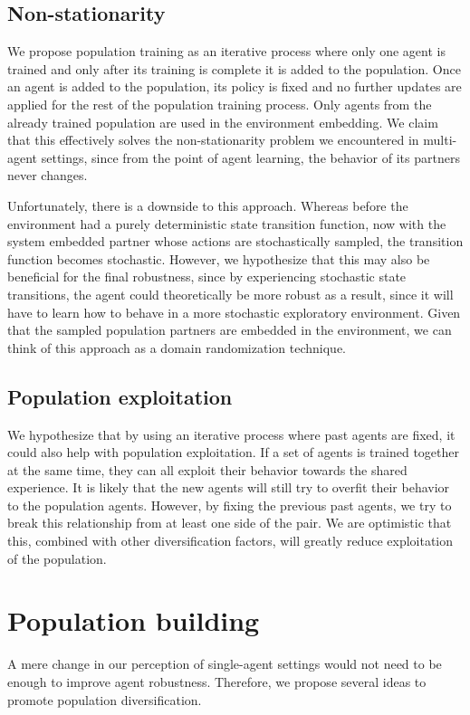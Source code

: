 \subsection{Non-stationarity}
We propose population training as an iterative process where only one agent is trained and only after its training is complete it is added to the population.
Once an agent is added to the population, its policy is fixed and no further updates are applied for the rest of the population training process.
Only agents from the already trained population are used in the environment embedding.
We claim that this effectively solves the non-stationarity problem we encountered in multi-agent settings, since from the point of agent learning, the behavior of its partners never changes.

Unfortunately, there is a downside to this approach.
Whereas before the environment had a purely deterministic state transition function, now with the system embedded partner whose actions are stochastically sampled, the transition function becomes stochastic.
However, we hypothesize that this may also be beneficial for the final robustness, since by experiencing stochastic state transitions, the agent could theoretically be more robust as a result, since it will have to learn how to behave in a more stochastic exploratory environment.
Given that the sampled population partners are embedded in the environment, we can think of this approach as a domain randomization technique.

\subsection{Population exploitation}
We hypothesize that by using an iterative process where past agents are fixed, it could also help with population exploitation.
If a set of agents is trained together at the same time, they can all exploit their behavior towards the shared experience.
It is likely that the new agents will still try to overfit their behavior to the population agents.
However, by fixing the previous past agents, we try to break this relationship from at least one side of the pair.
We are optimistic that this, combined with other diversification factors, will greatly reduce exploitation of the population.


\section{Population building}
A mere change in our perception of single-agent settings would not need to be enough to improve agent robustness.
Therefore, we propose several ideas to promote population diversification.
